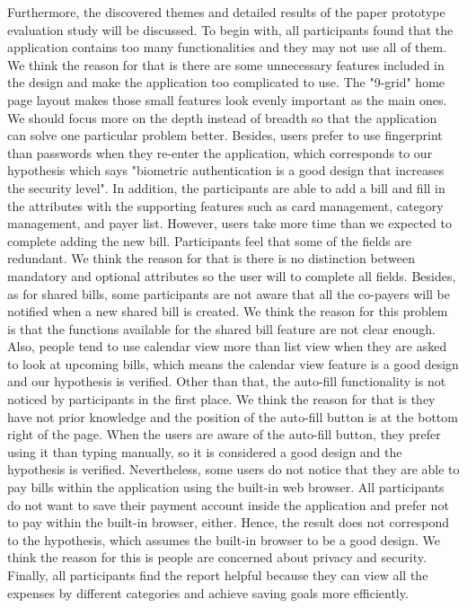 \documentclass{sigchi}
\begin{document}
Furthermore, the discovered themes and detailed results of the paper prototype evaluation study will be discussed. To begin with, all participants found that the application contains too many functionalities and they may not use all of them. We think the reason for that is there are some unnecessary features included in the design and make the application too complicated to use. The "9-grid" home page layout makes those small features look evenly important as the main ones. We should focus more on the depth instead of breadth so that the application can solve one particular problem better. Besides, users prefer to use fingerprint than passwords when they re-enter the application, which corresponds to our hypothesis which says "biometric authentication is a good design that increases the security level". In addition, the participants are able to add a bill and fill in the attributes with the supporting features such as card management, category management, and payer list. However, users take more time than we expected to complete adding the new bill. Participants feel that some of the fields are redundant. We think the reason for that is there is no distinction between mandatory and optional attributes so the user will to complete all fields. Besides, as for shared bills, some participants are not aware that all the co-payers will be notified when a new shared bill is created. We think the reason for this problem is that the functions available for the shared bill feature are not clear enough. Also, people tend to use calendar view more than list view when they are asked to look at upcoming bills, which means the calendar view feature is a good design and our hypothesis is verified. Other than that, the auto-fill functionality is not noticed by participants in the first place. We think the reason for that is they have not prior knowledge and the position of the auto-fill button is at the bottom right of the page. When the users are aware of the auto-fill button, they prefer using it than typing manually, so it is considered a good design and the hypothesis is verified. Nevertheless, some users do not notice that they are able to pay bills within the application using the built-in web browser. All participants do not want to save their payment account inside the application and prefer not to pay within the built-in browser, either. Hence, the result does not correspond to the hypothesis, which assumes the built-in browser to be a good design. We think the reason for this is people are concerned about privacy and security. Finally, all participants find the report helpful because they can view all the expenses by different categories and achieve saving goals more efficiently. 
\end{document}
